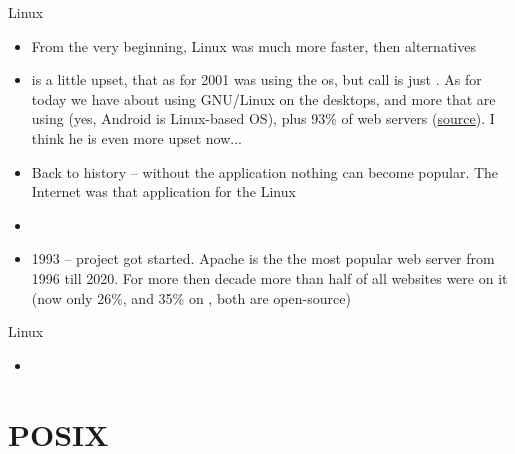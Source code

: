 \documentclass[usenames,dvipsnames,10pt,aspectratio=169]{beamer}
\begin{document}
\begin{frame}{Linux}
    \begin{itemize}
        \item From the very beginning, Linux was much more faster, then alternatives
        \item {} is a little upset, that as for 2001  was using the  os, but call is just . As for today we have about  using GNU/Linux on the desktops, and more that  are using  (yes, Android is Linux-based OS), plus 93\% of web servers (\href{https://news.netcraft.com/archives/category/web-server-survey/}{source}). I think he is even more upset now...
        \item Back to history -- without the application nothing can become popular. The Internet was that application for the Linux
        \item {}
        \item 1993 --  project got started. Apache is the the most popular web server from 1996 till 2020. For more then decade more than half of all websites were on it (now only 26\%, and 35\% on , both are open-source)
    \end{itemize}
\end{frame}

\begin{frame}{Linux}
    \begin{itemize}
        \item 
    \end{itemize}
\end{frame}

\section{POSIX}
\end{document}
